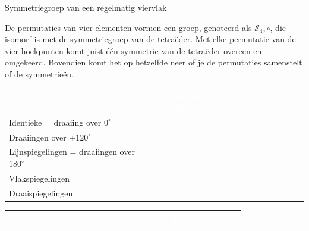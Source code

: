 \begin{lesactiviteit}{Symmetriegroep van een regelmatig viervlak}
\begin{vraagenantwoord}[resume]
 \end{vraagenantwoord}
 
 De permutaties van vier elementen vormen een groep, genoteerd als $\mathscr{S}_4, \circ$, die isomorf is met de symmetriegroep van de tetraëder. Met elke permutatie van de vier hoekpunten komt juist één symmetrie van de tetraëder overeen en omgekeerd. Bovendien komt het op hetzelfde neer of je de permutaties samenstelt of de symmetrieën.
 
\begin{vraagenantwoord}[resume]
 

\begin{center}
		
\begin{tabel}

\setlength{\extrarowheight}{3pt}

		\begin{tabular}{ | p{4.5cm}l | p{8.5cm}l | } 
		\hline
		\rowcolor{\rubriekkleur}\textcolor{white}{\textbf{Soort symmetrie}} & \textcolor{white}{\textbf{Permutaties van de hoekpunten}}\\
		
		Identieke = draaiing over $0^\circ$ & \\
		\hline
		Draaiingen over $\pm 120^\circ$ & \\
		\hline
		
		Lijnspiegelingen = draaiingen over $180^\circ$ & \\
		\hline
		
		Vlakspiegelingen & \\
		\hline
		
		Draaispiegelingen & \\
			\hline
 			 
		\end{tabular}		
		
		\end{tabel}
		
		\end{center}


\begin{center}
		
\begin{tabel}

\setlength{\extrarowheight}{3pt}

		\begin{tabular}{| p{4.5cm}l|p{8.5cm}l | } 
		\hline
		\rowcolor{\rubriekkleur}\textcolor{white}{\textbf{Soort symmetrie}} & \textcolor{white}{\textbf{Permutaties van de hoekpunten}}\\
		

\end{tabular}
\end{tabel}
\end{center}
\end{vraagenantwoord}
\end{lesactiviteit}
